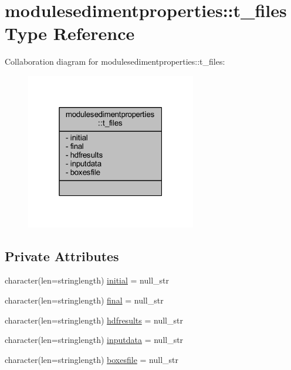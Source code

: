 \hypertarget{structmodulesedimentproperties_1_1t__files}{}\section{modulesedimentproperties\+:\+:t\+\_\+files Type Reference}
\label{structmodulesedimentproperties_1_1t__files}


Collaboration diagram for modulesedimentproperties\+:\+:t\+\_\+files\+:\nopagebreak
\begin{figure}[H]
\begin{center}
\leavevmode
\includegraphics[width=211pt]{structmodulesedimentproperties_1_1t__files__coll__graph}
\end{center}
\end{figure}
\subsection*{Private Attributes}
\begin{DoxyCompactItemize}
\item 
character(len=stringlength) \mbox{\hyperlink{structmodulesedimentproperties_1_1t__files_a0b30a8d1fb7f8e07833ce0c9fd718496}{initial}} = null\+\_\+str
\item 
character(len=stringlength) \mbox{\hyperlink{structmodulesedimentproperties_1_1t__files_a71e77738377158770c560235fcff0993}{final}} = null\+\_\+str
\item 
character(len=stringlength) \mbox{\hyperlink{structmodulesedimentproperties_1_1t__files_a12c26f17636a2950e4b41be55fd015a0}{hdfresults}} = null\+\_\+str
\item 
character(len=stringlength) \mbox{\hyperlink{structmodulesedimentproperties_1_1t__files_ac239b08070db52c8d5779b636fc48cf2}{inputdata}} = null\+\_\+str
\item 
character(len=stringlength) \mbox{\hyperlink{structmodulesedimentproperties_1_1t__files_af3d70e1b3cd9b7d652d0034b212530cb}{boxesfile}} = null\+\_\+str
\end{DoxyCompactItemize}


